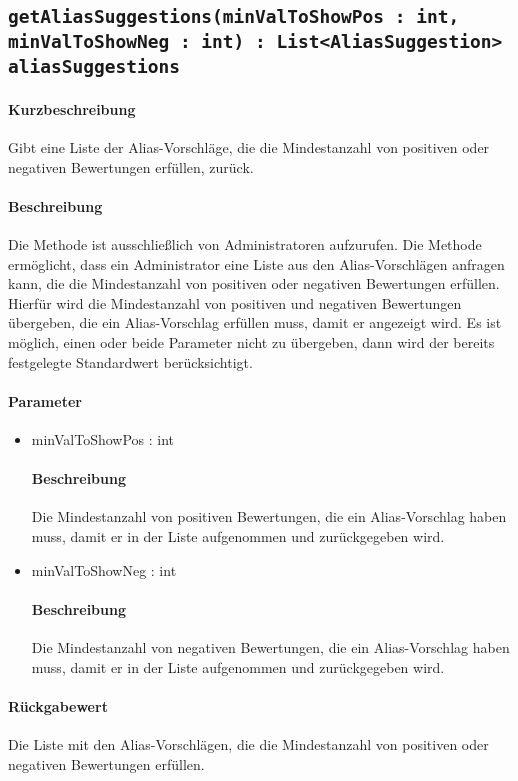 \subsection{\texttt{getAliasSuggestions(minValToShowPos : int, minValToShowNeg : int) : List<AliasSuggestion> aliasSuggestions}}%
\paragraph*{Kurzbeschreibung}
Gibt eine Liste der Alias-Vorschläge, die die Mindestanzahl von positiven oder negativen Bewertungen erfüllen, zurück.
\paragraph*{Beschreibung}
Die Methode ist ausschließlich von Administratoren aufzurufen.
Die Methode ermöglicht, dass ein Administrator eine Liste aus den Alias-Vorschlägen anfragen kann, die die Mindestanzahl von positiven oder negativen Bewertungen erfüllen.
Hierfür wird die Mindestanzahl von positiven und negativen Bewertungen übergeben, die ein Alias-Vorschlag erfüllen muss, damit er angezeigt wird.
Es ist möglich, einen oder beide Parameter nicht zu übergeben, dann wird der bereits festgelegte Standardwert berücksichtigt.
\paragraph*{Parameter}
\begin{itemize}
	\item minValToShowPos : int
		\paragraph*{Beschreibung}
		Die Mindestanzahl von positiven Bewertungen, die ein Alias-Vorschlag haben muss, damit er in der Liste aufgenommen und zurückgegeben wird.
	\item minValToShowNeg : int
		\paragraph*{Beschreibung}
		Die Mindestanzahl von negativen Bewertungen, die ein Alias-Vorschlag haben muss, damit er in der Liste aufgenommen und zurückgegeben wird.
\end{itemize}
\paragraph*{Rückgabewert}
Die Liste mit den Alias-Vorschlägen, die die Mindestanzahl von positiven oder negativen Bewertungen erfüllen.
